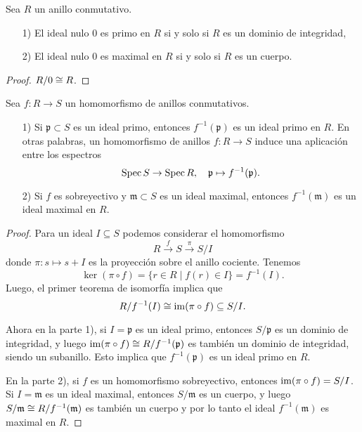 \begin{corolario}
  Sea $R$ un anillo conmutativo.

  \begin{enumerate}
  \item[1)] El ideal nulo $0$ es primo en $R$ si y solo si $R$ es un dominio
    de integridad,

  \item[2)] El ideal nulo $0$ es maximal en $R$ si y solo si $R$ es un cuerpo.
  \end{enumerate}

  \begin{proof}
    $R/0 \cong R$.
  \end{proof}
\end{corolario}

\begin{observacion}
  \label{obs:preimagen-de-un-ideal-primo}
  Sea $f\colon R\to S$ un homomorfismo de anillos conmutativos.

  \begin{enumerate}
  \item[1)] Si $\mathfrak{p} \subset S$ es un ideal primo, entonces
    $f^{-1} (\mathfrak{p})$ es un ideal primo en $R$. En otras palabras,
    un homomorfismo de anillos $f\colon R\to S$ induce una aplicación entre los
    espectros
    $$\operatorname{Spec} S \to \operatorname{Spec} R, \quad \mathfrak{p} \mapsto f^{-1} (\mathfrak{p}).$$

  \item[2)] Si $f$ es sobreyectivo y $\mathfrak{m} \subset S$ es un ideal
    maximal, entonces $f^{-1} (\mathfrak{m})$ es un ideal maximal en $R$.
  \end{enumerate}

  \begin{proof}
    Para un ideal $I \subseteq S$ podemos considerar el homomorfismo
    $$R \xrightarrow{f} S \xrightarrow{\pi} S/I$$
    donde $\pi\colon s \mapsto s + I$ es la proyección sobre el anillo
    cociente. Tenemos
    $$\ker (\pi\circ f) = \{ r \in R \mid f (r) \in I \} = f^{-1} (I).$$
    Luego, el primer teorema de isomorfía implica que
    $$R/f^{-1} (I) \cong \operatorname{im} (\pi\circ f) \subseteq S/I.$$

    Ahora en la parte 1), si $I = \mathfrak{p}$ es un ideal primo, entonces
    $S/\mathfrak{p}$ es un dominio de integridad, y luego
    $\operatorname{im} (\pi\circ f) \cong R/f^{-1} (\mathfrak{p})$ es también un dominio de
    integridad, siendo un subanillo. Esto implica que $f^{-1} (\mathfrak{p})$ es
    un ideal primo en $R$.

    En la parte 2), si $f$ es un homomorfismo sobreyectivo, entonces
    $\operatorname{im} (\pi\circ f) = S/I$. Si $I = \mathfrak{m}$ es un ideal maximal,
    entonces $S/\mathfrak{m}$ es un cuerpo, y luego
    $S/\mathfrak{m} \cong R/f^{-1} (\mathfrak{m})$ es también un cuerpo y por lo
    tanto el ideal $f^{-1} (\mathfrak{m})$ es maximal en $R$.
  \end{proof}
\end{observacion}

